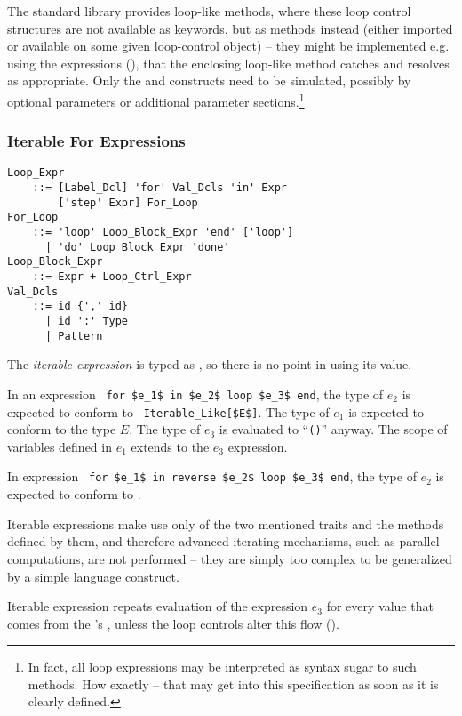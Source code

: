 The standard library provides loop-like methods, where these loop control structures are not available as keywords, but as methods instead (either imported or available on some given loop-control object) -- they might be implemented e.g. using the  expressions (), that the enclosing loop-like method catches and resolves as appropriate. Only the  and  constructs need to be simulated, possibly by optional parameters or additional parameter sections.\footnote{In fact, all loop expressions may be interpreted as syntax sugar to such methods. How exactly -- that may get into this specification as soon as it is clearly defined.} 





\subsubsection{Iterable For Expressions}
\label{sec:iterable-expressions}

\grammar\begin{lstlisting}
Loop_Expr 
    ::= [Label_Dcl] 'for' Val_Dcls 'in' Expr 
        ['step' Expr] For_Loop
For_Loop 
    ::= 'loop' Loop_Block_Expr 'end' ['loop']
      | 'do' Loop_Block_Expr 'done'
Loop_Block_Expr 
    ::= Expr + Loop_Ctrl_Expr
Val_Dcls 
    ::= id {',' id}
      | id ':' Type
      | Pattern
\end{lstlisting}

The {\em iterable expression} is typed as , so there is no point in using its value. 

In an expression ~\lstinline!for $e_1$ in $e_2$ loop $e_3$ end!, the type of $e_2$ is expected to conform to ~\lstinline!Iterable_Like[$E$]!. The type of $e_1$ is expected to conform to the type $E$. The type of $e_3$ is evaluated to ``\lstinline!()!'' anyway. The scope of variables defined in $e_1$ extends to the $e_3$ expression. 

In expression ~\lstinline!for $e_1$ in reverse $e_2$ loop $e_3$ end!, the type of $e_2$ is expected to conform to . 

Iterable expressions make use only of the two mentioned traits and the methods defined by them, and therefore advanced iterating mechanisms, such as parallel computations, are not performed -- they are simply too complex to be generalized by a simple language construct. 

Iterable expression repeats evaluation of the expression $e_3$ for every value that comes from the 's , unless the loop controls alter this flow ().

